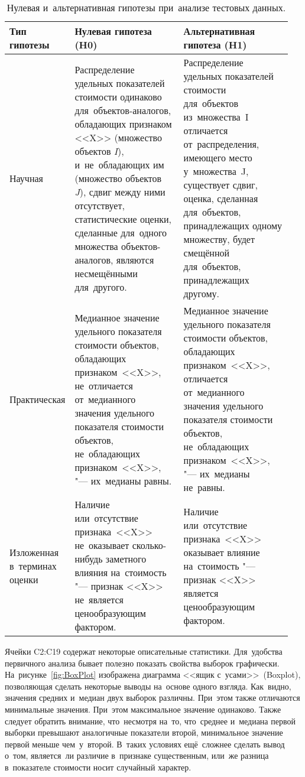 \documentclass[]{scrreprt}
\begin{document}
\begin{table}[ht]
	\caption{Нулевая и~альтернативная гипотезы при~анализе тестовых данных.}  \label{tab:nul-alt-hypothesis-variants}
	\centering
	\begin{tabularx}{\textwidth}{p{0.15\linewidth} p{0.4\linewidth} p{0.4\linewidth}} 
		\hline
		Тип гипотезы&Нулевая гипотеза (H0)&Альтернативная гипотеза (H1)\\
		\hline
		Научная&Распределение удельных показателей стоимости одинаково для~объектов-аналогов, обладающих признаком <<X>> (множество объектов \textit{I}), и~не~обладающих им (множество объектов \textit{J}), сдвиг между ними отсутствует, статистические оценки, сделанные для~одного множества объектов-аналогов, являются несмещёнными для~другого.&Распределение удельных показателей стоимости для~объектов из~множества~I отличается от~распределения, имеющего место у~множества~J, существует сдвиг, оценка, сделанная для~объектов, принадлежащих одному множеству, будет смещённой для~объектов, принадлежащих другому.\\
		\hline
		Практическая&Медианное значение удельного показателя стоимости объектов, обладающих признаком~<<X>>, не~отличается от~медианного значения удельного показателя стоимости объектов, не~обладающих признаком~<<X>>, "--- их~медианы равны.&Медианное значение удельного показателя стоимости объектов, обладающих признаком~<<X>>, отличается от~медианного значения удельного показателя стоимости объектов, не~обладающих признаком~<<X>>, "--- их~медианы не~равны.\\
		\hline
		Изложенная в~терминах оценки&Наличие или~отсутствие признака~<<X>> не~оказывает сколько-нибудь заметного влияния на~стоимость "--- признак <<X>> не~является ценообразующим фактором.&Наличие или~отсутствие признака~<<X>> оказывает влияние на~стоимость "--- признак <<X>> является ценообразующим фактором.\\ \hline
	\end{tabularx}
\end{table}
Ячейки C2:C19 содержат некоторые описательные статистики.  Для~удобства первичного анализа бывает полезно показать свойства выборок графически. На~рисунке~\ref{fig:BoxPlot} изображена диаграмма <<ящик с~усами>>~(\foreignlanguage{english}{Boxplot}), позволяющая сделать некоторые выводы на~основе одного взгляда. Как~видно, значения средних и~медиан двух выборок различны. При~этом также отличаются минимальные значения. При~этом максимальное значение одинаково. Также следует обратить внимание, что~несмотря на~то, что~среднее и~медиана первой выборки превышают аналогичные показатели второй, минимальное значение первой меньше чем~у~второй. В~таких условиях ещё~сложнее сделать вывод о~том, является~ли различие в~признаке существенным, или~же разница в~показателе стоимости носит случайный характер.
\end{document}
